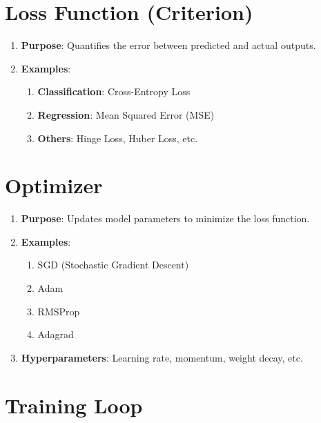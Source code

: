 \section{Loss Function (Criterion)}

\begin{enumerate}
    \item \textbf{Purpose}: Quantifies the error between predicted and actual outputs.

    \item \textbf{Examples}:
    \begin{enumerate}
        \item \textbf{Classification}: Cross-Entropy Loss
        \item \textbf{Regression}: Mean Squared Error (MSE)
        \item \textbf{Others}: Hinge Loss, Huber Loss, etc.
    \end{enumerate}
\end{enumerate}




\section{Optimizer}

\begin{enumerate}
    \item \textbf{Purpose}: Updates model parameters to minimize the loss function.

    \item \textbf{Examples}:
    \begin{enumerate}
        \item SGD (Stochastic Gradient Descent)
        \item Adam
        \item RMSProp
        \item Adagrad
    \end{enumerate}

    \item \textbf{Hyperparameters}: Learning rate, momentum, weight decay, etc.
\end{enumerate}



\section{Training Loop}

